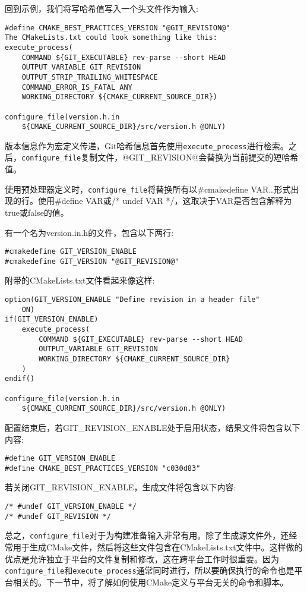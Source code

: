 回到示例，我们将写哈希值写入一个头文件作为输入:

\begin{lstlisting}[style=styleCMake]
#define CMAKE_BEST_PRACTICES_VERSION "@GIT_REVISION@"
The CMakeLists.txt could look something like this:
execute_process(
	COMMAND ${GIT_EXECUTABLE} rev-parse --short HEAD
	OUTPUT_VARIABLE GIT_REVISION
	OUTPUT_STRIP_TRAILING_WHITESPACE
	COMMAND_ERROR_IS_FATAL ANY
	WORKING_DIRECTORY ${CMAKE_CURRENT_SOURCE_DIR})

configure_file(version.h.in
	${CMAKE_CURRENT_SOURCE_DIR}/src/version.h @ONLY)
\end{lstlisting}

版本信息作为宏定义传递，Git哈希信息首先使用\texttt{execute\_process}进行检索。之后，\texttt{configure\_file}复制文件，@GIT\_REVISION@会替换为当前提交的短哈希值。

使用预处理器定义时，\texttt{configure\_file}将替换所有以\#cmakedefine VAR…形式出现的行。使用\#define VAR或/* undef VAR */，这取决于VAR是否包含解释为true或false的值。

有一个名为version.in.h的文件，包含以下两行:

\begin{lstlisting}[style=styleCMake]
#cmakedefine GIT_VERSION_ENABLE
#cmakedefine GIT_VERSION "@GIT_REVISION@"
\end{lstlisting}

附带的CMakeLists.txt文件看起来像这样:

\begin{lstlisting}[style=styleCMake]
option(GIT_VERSION_ENABLE "Define revision in a header file"
	ON)
if(GIT_VERSION_ENABLE)
	execute_process(
		COMMAND ${GIT_EXECUTABLE} rev-parse --short HEAD
		OUTPUT_VARIABLE GIT_REVISION
		WORKING_DIRECTORY ${CMAKE_CURRENT_SOURCE_DIR}
	)
endif()

configure_file(version.h.in
	${CMAKE_CURRENT_SOURCE_DIR}/src/version.h @ONLY)
\end{lstlisting}

配置结束后，若GIT\_REVISION\_ENABLE处于启用状态，结果文件将包含以下内容:

\begin{lstlisting}[style=styleCXX]
#define GIT_VERSION_ENABLE
#define CMAKE_BEST_PRACTICES_VERSION "c030d83"
\end{lstlisting}

若关闭GIT\_REVISION\_ENABLE，生成文件将包含以下内容:

\begin{lstlisting}[style=styleCXX]
/* #undef GIT_VERSION_ENABLE */
/* #undef GIT_REVISION */
\end{lstlisting}

总之，\texttt{configure\_file}对于为构建准备输入非常有用。除了生成源文件外，还经常用于生成CMake文件，然后将这些文件包含在CMakeLists.txt文件中。这样做的优点是允许独立于平台的文件复制和修改，这在跨平台工作时很重要。因为\texttt{configure\_file}和\texttt{execute\_process}通常同时进行，所以要确保执行的命令也是平台相关的。下一节中，将了解如何使用CMake定义与平台无关的命令和脚本。






















